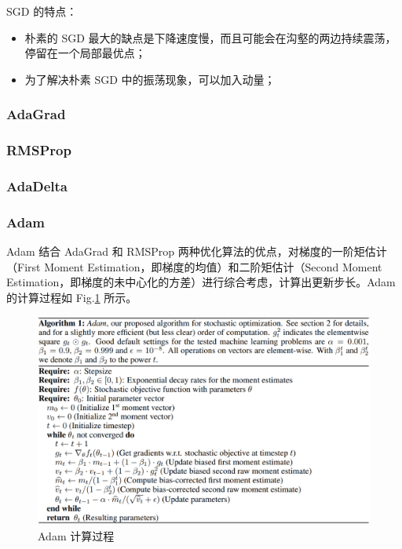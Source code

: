 SGD 的特点：
\begin{itemize}
	\item 朴素的 SGD 最大的缺点是下降速度慢，而且可能会在沟壑的两边持续震荡，停留在一个局部最优点；
	
	\item 为了解决朴素 SGD 中的振荡现象，可以加入动量；
\end{itemize}

\subsubsection{AdaGrad}

\subsubsection{RMSProp}

\subsubsection{AdaDelta}

\subsubsection{Adam}
Adam\cite{kingma2015adam} 结合 AdaGrad 和 RMSProp 两种优化算法的优点，对梯度的一阶矩估计（First Moment  Estimation，即梯度的均值）和二阶矩估计（Second Moment Estimation，即梯度的未中心化的方差）进行综合考虑，计算出更新步长。Adam 的计算过程如 Fig.\ref{fig:adam} 所示。

\begin{figure}[h]
	\centering
	\includegraphics[width=1.0\textwidth]{pics/adam.png}
	\caption{Adam 计算过程}
	\label{fig:adam}
\end{figure}

